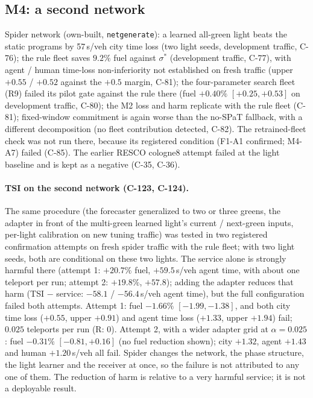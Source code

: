 \documentclass[11pt]{article}
\begin{document}
\subsection{M4: a second network}\label{sec:m4}
Spider network (own-built, \texttt{netgenerate}): a learned all-green light beats the static programs by 57\,s/veh city time loss (two light seeds, development
traffic, C-76); the rule fleet saves $9.2\%$ fuel against $\sigma^*$ (development traffic, C-77), with agent / human time-loss non-inferiority not established on fresh traffic
(upper $+0.55$ / $+0.52$ against the $+0.5$ margin, C-81);
the four-parameter search fleet (R9) failed its pilot gate against the rule there (fuel $+0.40\%$ $[+0.25,+0.53]$ on development
traffic, C-80); the M2 loss and harm replicate with the rule fleet (C-81); fixed-window commitment is again worse than the
no-SPaT fallback, with a different decomposition (no fleet contribution detected, C-82). The retrained-fleet check was not run there, because its registered condition (F1-A1 confirmed; M4-A7) failed (C-85). The
earlier RESCO cologne8 attempt failed at the light baseline and is kept as a negative (C-35, C-36).
\paragraph{TSI on the second network (C-123, C-124).} The same procedure (the forecaster generalized to two or three greens, the adapter
in front of the multi-green learned light's current / next-green inputs, per-light calibration on new tuning traffic) was tested in two registered
confirmation attempts on fresh spider traffic with the rule fleet; with two light seeds, both are conditional on these two lights. The service alone is strongly harmful there (attempt 1: $+20.7\%$ fuel, $+59.5$\,s/veh agent time, with about one
teleport per run; attempt 2: $+19.8\%$, $+57.8$); adding the adapter reduces that harm (TSI $-$ service: $-58.1$ / $-56.4$\,s/veh agent time), but the full configuration failed both attempts. Attempt 1: fuel $-1.66\%$
$[-1.99,-1.38]$, and both city time loss ($+0.55$, upper $+0.91$) and agent time loss ($+1.33$, upper $+1.94$) fail; $0.025$ teleports per
run (R: 0). Attempt 2, with a wider adapter grid at $\alpha=0.025$: fuel $-0.31\%$ $[-0.81,+0.16]$ (no fuel reduction shown); city $+1.32$,
agent $+1.43$ and human $+1.20$\,s/veh all fail. Spider changes the network, the phase structure, the light learner and the receiver at
once, so the failure is not attributed to any one of them. The reduction of harm is relative to a very harmful service; it is not a
deployable result.
\end{document}
